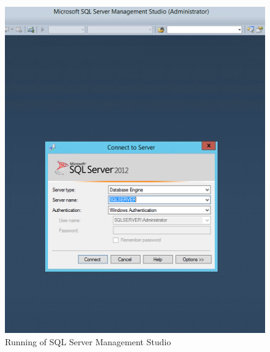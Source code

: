 \documentclass[english]{article}
\begin{document}
\begin{figure}[hb]
\centerline{\includegraphics[scale=0.6]{SQL/studiaReady}}
\caption{Running of SQL Server Management Studio}
\end{figure}
\end{document}
